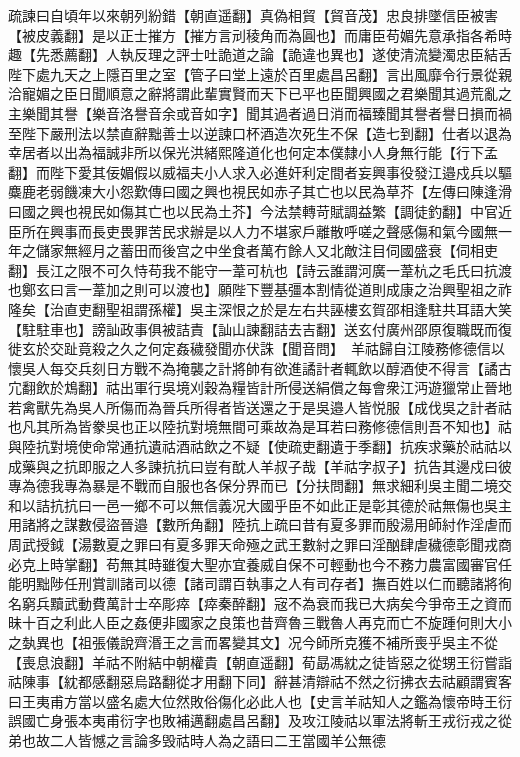 疏諫曰自頃年以來朝列紛錯【朝直遥翻】真偽相貿【貿音茂】忠良排墜信臣被害【被皮義翻】是以正士摧方【摧方言刓稜角而為圓也】而庸臣苟媚先意承指各希時趣【先悉薦翻】人執反理之評士吐詭道之論【詭違也異也】遂使清流變濁忠臣結舌陛下處九天之上隱百里之室【管子曰堂上遠於百里處昌呂翻】言出風靡令行景從親洽寵媚之臣日聞順意之辭將謂此輩實賢而天下已平也臣聞興國之君樂聞其過荒亂之主樂聞其譽【樂音洛譽音余或音如字】聞其過者過日消而福臻聞其譽者譽日損而禍至陛下嚴刑法以禁直辭黜善士以逆諫口杯酒造次死生不保【造七到翻】仕者以退為幸居者以出為福誠非所以保光洪緒熙隆道化也何定本僕隸小人身無行能【行下孟翻】而陛下愛其佞媚假以威福夫小人求入必進奸利定間者妄興事役發江邉戍兵以驅麋鹿老弱饑凍大小怨歎傳曰國之興也視民如赤子其亡也以民為草芥【左傳曰陳逢滑曰國之興也視民如傷其亡也以民為土芥】今法禁轉苛賦調益繁【調徒釣翻】中官近臣所在興事而長吏畏罪苦民求辦是以人力不堪家戶離散呼嗟之聲感傷和氣今國無一年之儲家無經月之蓄田而後宫之中坐食者萬冇餘人又北敵注目伺國盛衰【伺相吏翻】長江之限不可久恃苟我不能守一葦可杭也【詩云誰謂河廣一葦杭之毛氏曰抗渡也鄭玄曰言一葦加之則可以渡也】願陛下豐基彊本割情從道則成康之治興聖祖之祚隆矣【治直吏翻聖祖謂孫權】吳主深恨之於是左右共誣樓玄賀邵相逢駐共耳語大笑【駐駐車也】謗訕政事俱被詰責【訕山諫翻詰去吉翻】送玄付廣州邵原復職既而復徙玄於交趾竟殺之久之何定姦穢發聞亦伏誅【聞音問】　羊祜歸自江陵務修德信以懷吳人每交兵刻日方戰不為掩襲之計將帥有欲進譎計者輒飲以醇酒使不得言【譎古宂翻飲於鴆翻】祜出軍行吳境刈穀為糧皆計所侵送絹償之每會衆江沔遊獵常止晉地若禽獸先為吳人所傷而為晉兵所得者皆送還之于是吳邉人皆悦服【成伐吳之計者祜也凡其所為皆豢吳也正以陸抗對境無間可乘故為是耳若曰務修德信則吾不知也】祜與陸抗對境使命常通抗遺祜酒祜飲之不疑【使疏吏翻遺于季翻】抗疾求藥於祜祜以成藥與之抗即服之人多諫抗抗曰豈有酖人羊叔子哉【羊祜字叔子】抗告其邊戍曰彼專為德我專為暴是不戰而自服也各保分界而已【分扶問翻】無求細利吳主聞二境交和以詰抗抗曰一邑一鄉不可以無信義况大國乎臣不如此正是彰其德於祜無傷也吳主用諸將之謀數侵盜晉邉【數所角翻】陸抗上疏曰昔有夏多罪而殷湯用師紂作淫虐而周武授鉞【湯數夏之罪曰有夏多罪天命殛之武王數紂之罪曰淫酗肆虐穢德彰聞戎商必克上時掌翻】苟無其時雖復大聖亦宜養威自保不可輕動也今不務力農富國審官任能明黜陟任刑賞訓諸司以德【諸司謂百執事之人有司存者】撫百姓以仁而聽諸將徇名窮兵黷武動費萬計士卒彫瘁【瘁秦醉翻】宼不為衰而我已大病矣今爭帝王之資而昧十百之利此人臣之姦便非國家之良策也昔齊魯三戰魯人再克而亡不旋踵何則大小之埶異也【祖張儀說齊湣王之言而畧變其文】况今師所克獲不補所喪乎吳主不從【喪息浪翻】羊祜不附結中朝權貴【朝直遥翻】荀勗馮紞之徒皆惡之從甥王衍嘗詣祜陳事【紞都感翻惡烏路翻從才用翻下同】辭甚清辯祜不然之衍拂衣去祜顧謂賓客曰王夷甫方當以盛名處大位然敗俗傷化必此人也【史言羊祜知人之鑑為懷帝時王衍誤國亡身張本夷甫衍字也敗補邁翻處昌呂翻】及攻江陵祜以軍法將斬王戎衍戎之從弟也故二人皆憾之言論多毁祜時人為之語曰二王當國羊公無德

